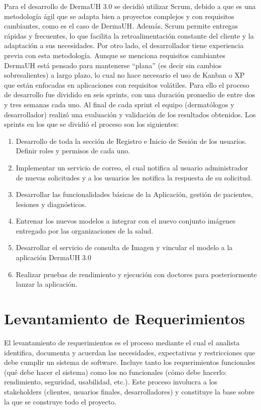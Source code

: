 Para el desarrollo de DermaUH 3.0 se decidi\'o utilizar Scrum, debido a que es una metodología ágil que 
se adapta bien a proyectos complejos y con requisitos cambiantes, como es el caso de DermaUH. Además, Scrum permite entregas rápidas y 
frecuentes, lo que facilita la retroalimentación constante del cliente y la adaptación a sus necesidades.
Por otro lado, el desarrollador tiene experiencia previa con esta metodolog\'ia. Aunque se menciona requisitos cambiantes
DermaUH est\'a pensado para mantenerse ``plana'' (es decir sin cambios sobresalientes) a largo plazo,
lo cual no hace necesario el uso de Kanban o XP que est\'an enfocadas en aplicaciones con requisitos vol\'atiles.
Para ello el proceso de desarrollo fue dividido en seis sprints, con una duraci\'on promedio de entre dos y tres semanas cada uno.
Al final de cada sprint el equipo (dermat\'ologos y desarrollador) realiz\'o una evaluaci\'on y validaci\'on de los resultados obtenidos. Los sprints en los que se dividi\'o el proceso
son los siguientes:

\begin{enumerate}
    \item Desarrollo de toda la secci\'on de Registro e Inicio de Sesi\'on de los usuarios. Definir roles y permisos de cada uno.
    \item Implementar un servicio de correo, el cual notifica al usuario administrador de nuevas solicitudes y a los usuarios les notifica la respuesta de su solicitud.
    \item Desarrollar las funcionalidades b\'asicas de la Aplicaci\'on, gesti\'on de pacientes, lesiones y diagn\'osticos.
    \item Entrenar los nuevos modelos a integrar con el nuevo conjunto im\'agenes entregado por las organizaciones de la salud.
    \item Desarrollar el servicio de consulta de Imagen y vincular el modelo a la aplicaci\'on DermaUH 3.0
    \item Realizar pruebas de rendimiento y ejecuci\'on con doctores para posteriormente lanzar la aplicaci\'on.
\end{enumerate}

\section{Levantamiento de Requerimientos}
El levantamiento de requerimientos es el proceso mediante el cual el analista identifica, 
documenta y acuerdan las necesidades, expectativas y restricciones que debe cumplir un 
sistema de software. Incluye tanto los requerimientos funcionales (qué debe hacer el sistema) 
como los no funcionales (cómo debe hacerlo: rendimiento, seguridad, usabilidad, etc.). 
Este proceso involucra a los stakeholders (clientes, usuarios finales, desarrolladores) y 
constituye la base sobre la que se construye todo el proyecto.

